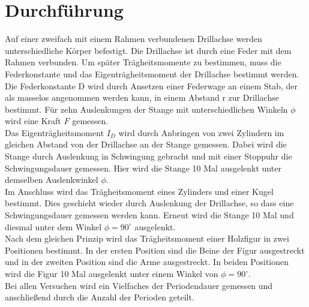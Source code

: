 \section{Durchführung}
\label{sec:Durchführung}
Auf einer zweifach mit einem Rahmen verbundenen Drillachse werden unterschiedliche Körper befestigt.
Die Drillachse ist durch eine Feder mit dem Rahmen verbunden. Um später Trägheitsmomente zu bestimmen,
muss die Federkonstante und das Eigenträgheitsmoment der Drillachse bestimmt werden. \\
Die Federkonstante D wird durch Ansetzen einer Federwage an einem Stab, der als masselos angenommen werden kann, 
in einem Abstand r zur Drillachse bestimmt. Für zehn Auslenkungen der Stange mit unterschiedlichen Winkeln $\phi$ wird eine Kraft $F$ gemessen.\\
Das Eigenträgheitsmoment $I_D$ wird durch Anbringen von zwei Zylindern im gleichen Abstand von der Drillachse
an der Stange gemessen. Dabei wird die Stange durch Auslenkung in Schwingung gebracht und mit einer Stoppuhr
die Schwingungsdauer gemessen. Hier wird die Stange 10 Mal ausgelenkt unter demselben Auslenkwinkel $\phi$.\\
Im Anschluss wird das Trägheitsmoment eines Zylinders und einer Kugel bestimmt. Dies geschieht wieder durch 
Auslenkung der Drillachse, so dass eine Schwingungsdauer gemessen werden kann. Erneut wird die Stange 10 Mal und diesmal unter
dem Winkel $\phi= 90^{\circ}$ ausgelenkt.\\
Nach dem gleichen Prinzip wird das Trägheitsmoment einer Holzfigur in zwei Positionen bestimmt.
In der ersten Position sind die Beine der Figur ausgestreckt und in der zweiten Position sind die Arme ausgestreckt.
In beiden Positionen wird die Figur 10 Mal ausgelenkt unter einem Winkel von $\phi=90^{\circ}$.\\
Bei allen Versuchen wird ein Vielfaches der Periodendauer gemessen und anschließend durch die Anzahl der
Perioden geteilt.
\newpage